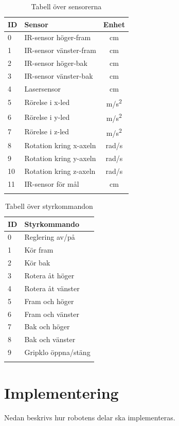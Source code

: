 \documentclass[11pt]{article}
\begin{document}
\begin{flushleft}
\begin{longtable}[l]{| l | l | c |} \hline
\textbf{ID} & \textbf{Sensor} & \textbf{Enhet} \\ \hline 
0 & IR-sensor höger-fram & cm \\ \hline
1 & IR-sensor vänster-fram  & cm \\ \hline
2 & IR-sensor höger-bak  & cm  \\ \hline
3 & IR-sensor vänster-bak  &  cm \\ \hline
4 & Lasersensor & cm  \\ \hline
5 & Rörelse i x-led & m/s\textsuperscript{2} \\ \hline
6 & Rörelse i y-led & m/s\textsuperscript{2} \\ \hline
7 & Rörelse i z-led & m/s\textsuperscript{2} \\ \hline
8 & Rotation kring x-axeln & rad/s \\ \hline
9 & Rotation kring y-axeln & rad/s \\ \hline
10 & Rotation kring z-axeln & rad/s \\ \hline
11 & IR-sensor för mål & cm \\ \hline
\caption{Tabell över sensorerna}\label{sensortab}
\end{longtable}

\begin{longtable}[l]{| l | l |} \hline
\textbf{ID} & \textbf{Styrkommando} \\ \hline 
0 & Reglering av/på \\ \hline
1 & Kör fram \\ \hline
2 & Kör bak \\ \hline
3 & Rotera åt höger \\ \hline
4 & Rotera åt vänster \\ \hline
5 & Fram och höger \\ \hline
6 & Fram och vänster \\ \hline
7 & Bak och höger \\ \hline
8 & Bak och vänster \\ \hline
9 & Gripklo öppna/stäng \\ \hline

\caption{Tabell över styrkommandon}\label{styrtab}
\end{longtable}

\pagebreak
\section{Implementering}
Nedan beskrivs hur robotens delar ska implementeras. 



\end{flushleft}
\end{document}
